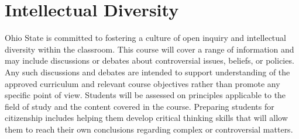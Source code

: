 \documentclass{ximera}
\begin{document}
\section*{Intellectual Diversity}
Ohio State is committed to fostering a culture of open inquiry and intellectual diversity within the classroom. This course will cover a range of information and may include discussions or debates about controversial issues, beliefs, or policies. Any such discussions and debates are intended to support understanding of the approved curriculum and relevant course objectives rather than promote any specific point of view. Students will be assessed on principles applicable to the field of study and the content covered in the course. Preparing students for citizenship includes helping them develop critical thinking skills that will allow them to reach their own conclusions regarding complex or controversial matters.
\end{document}
